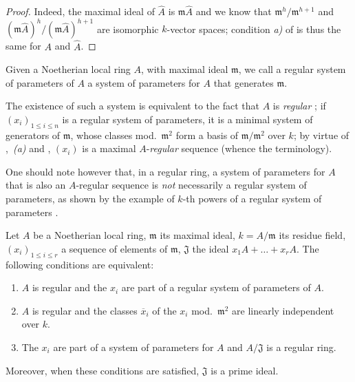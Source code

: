 \begin{proof}
Indeed, the maximal ideal of $\widehat{A}$ is $\mathfrak{m}\widehat{A}$ and we know that $\mathfrak{m}^h/\mathfrak{m}^{h+1}$ and $(\mathfrak{m}\widehat{A})^h/(\mathfrak{m}\widehat{A})^{h+1}$ are isomorphic $k$-vector spaces;
condition \emph{a)} of  is thus the same for $A$ and $\widehat{A}$.
\end{proof}

\begin{definition}[17.1.6]
\label{0.17.1.6}
Given a Noetherian local ring $A$, with maximal ideal $\mathfrak{m}$, we call a regular system of parameters of $A$ a system of parameters for $A$  that generates $\mathfrak{m}$.
\end{definition}

The existence of such a system is equivalent to the fact that $A$ is \emph{regular} ;
if $(x_i)_{1\leq i\leq n}$ is a regular system of parameters, it is a minimal system of generators of $\mathfrak{m}$, whose classes mod.~$\mathfrak{m}^2$ form a basis of $\mathfrak{m}/\mathfrak{m}^2$ over $k$;
by virtue of ,~\emph{(a)} and , $(x_i)$ is a maximal $A$-\emph{regular} sequence (whence the terminology).

One should note however that, in a regular ring, a system of parameters for $A$ that is also an $A$-regular sequence is \emph{not} necessarily a regular system of parameters, as shown by the example of $k$-th powers of a regular system of parameters .

\begin{proposition}[17.1.7]
\label{0.17.1.7}
Let $A$ be a Noetherian local ring, $\mathfrak{m}$ its maximal ideal, $k=A/\mathfrak{m}$ its residue field, $(x_i)_{1\leq i\leq r}$ a sequence of elements of $\mathfrak{m}$, $\mathfrak{J}$ the ideal $x_1 A+\ldots+x_r A$.
The following conditions are equivalent:
\begin{enumerate}
  \item[{\rm a)}] $A$ is regular and the $x_i$ are part of a regular system of parameters of $A$.
  \item[{\rm a')}] $A$ is regular and the classes $\overline{x}_i$ of the $x_i$ \textup{mod.}~$\mathfrak{m}^2$ are linearly independent over $k$.
  \item[{\rm b)}] The $x_i$ are part of a system of parameters for $A$ and $A/\mathfrak{J}$ is a regular ring.
\end{enumerate}
Moreover, when these conditions are satisfied, $\mathfrak{J}$ is a prime ideal.
\end{proposition}

